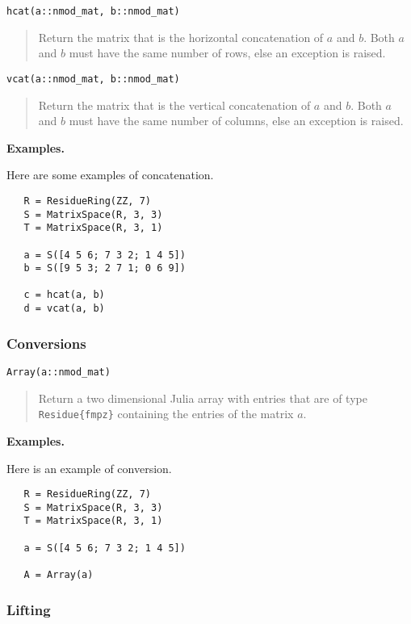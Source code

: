 \documentclass[a4paper,10pt]{article}
\newcommand{\code}{\lstinline}
\newcommand{\desc}[1]{\vspace{-3mm}\begin{quote}#1\end{quote}}
\begin{document}
{{\begin{lstlisting}
hcat(a::nmod_mat, b::nmod_mat)
\end{lstlisting}

\desc{Return the matrix that is the horizontal concatenation of $a$ and $b$.
Both $a$ and $b$ must have the same number of rows, else an exception is raised.}

\begin{lstlisting}
vcat(a::nmod_mat, b::nmod_mat)
\end{lstlisting}

\desc{Return the matrix that is the vertical concatenation of $a$ and $b$.
Both $a$ and $b$ must have the same number of columns, else an exception is raised.}

\textbf{Examples.}

Here are some examples of concatenation.

\begin{lstlisting}
   R = ResidueRing(ZZ, 7)
   S = MatrixSpace(R, 3, 3)
   T = MatrixSpace(R, 3, 1)

   a = S([4 5 6; 7 3 2; 1 4 5])
   b = S([9 5 3; 2 7 1; 0 6 9])
  
   c = hcat(a, b)
   d = vcat(a, b)
\end{lstlisting}

\subsubsection{Conversions}

\begin{lstlisting}
Array(a::nmod_mat)
\end{lstlisting}

\desc{Return a two dimensional Julia array with entries that are of type
\code|Residue{fmpz}| containing the entries of the matrix $a$.} 

\textbf{Examples.}

Here is an example of conversion.

\begin{lstlisting}
   R = ResidueRing(ZZ, 7)
   S = MatrixSpace(R, 3, 3)
   T = MatrixSpace(R, 3, 1)

   a = S([4 5 6; 7 3 2; 1 4 5])
  
   A = Array(a)
\end{lstlisting}

\subsubsection{Lifting}

}}
\end{document}
